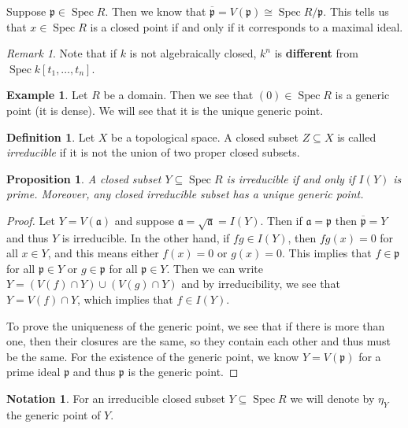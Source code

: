 \documentclass[leqno, openany]{memoir}
\newtheorem{prop}[thm]{Proposition}
\theoremstyle{definition}
\newtheorem{defn}[thm]{Definition}
\newtheorem{exm}[thm]{Example}
\newtheorem{notn}[thm]{Notation}
\theoremstyle{remark}
\newtheorem{rmk}[thm]{Remark}
\theoremstyle{plain}
\theoremstyle{definition}
\theoremstyle{remark}
\newcommand{\mf}[1]{\mathfrak{#1}}
\newcommand{\ol}[1]{\overline{#1}}
\DeclareMathOperator{\Spec}{Spec}
\begin{document}
Suppose $\mf{p} \in \Spec R$. Then we know that $\ol{\mf{p}} = V(\mf{p}) \cong
\Spec R/\mf{p}$. This tells us that $x \in \Spec R$ is a closed point if and
only if it corresponds to a maximal ideal. 

\begin{rmk} Note that if $k$ is not algebraically closed, $k^n$ is
\textbf{different} from $\Spec k[t_1, \ldots, t_n]$.  \end{rmk}

\begin{exm} Let $R$ be a domain. Then we see that $(0) \in \Spec R$ is a
generic point (it is dense). We will see that it is the unique generic point.
\end{exm}

\begin{defn} Let $X$ be a topological space. A closed subset $Z \subseteq X$ is
called \textit{irreducible} if it is not the union of two proper closed
subsets.  \end{defn}

\begin{prop} A closed subset $Y \subseteq \Spec R$ is irreducible if and only
if $I(Y)$ is prime. Moreover, any closed irreducible subset has a unique
generic point.  \end{prop}

\begin{proof} Let $Y = V(\mf{a})$ and suppose $\mf{a} = \sqrt{\mf{a}} = I(Y)$.
    Then if $\mf{a} = \mf{p}$ then $\ol{\mf{p}} = Y$ and thus $Y$ is
    irreducible. In the other hand, if $fg \in I(Y)$, then $fg(x) = 0$ for all
    $x \in Y$, and this means either $f(x) = 0$ or $g(x) = 0$. This implies
    that $f \in \mf{p}$ for all $\mf{p} \in Y$ or $g \in \mf{p}$ for all
    $\mf{p} \in Y$. Then we can write $Y = ( V(f) \cap Y ) \cup ( V(g) \cap Y
    )$ and by irreducibility, we see that $Y = V(f) \cap Y$, which implies that
    $f \in I(Y)$.

    To prove the uniqueness of the generic point, we see that if there is more
than one, then their closures are the same, so they contain each other and thus
must be the same. For the existence of the generic point, we know $Y =
V(\mf{p})$ for a prime ideal $\mf{p}$ and thus $\mf{p}$ is the generic point.
\end{proof}

\begin{notn} For an irreducible closed subset $Y \subseteq \Spec R$ we will
denote by $\eta_Y$ the generic point of $Y$.  \end{notn}
\end{document}
